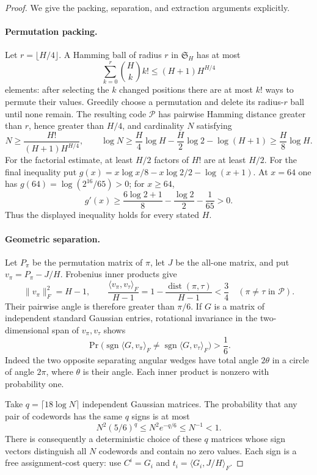 \documentclass[11pt]{article}
\begin{document}
\begin{proof}
We give the packing, separation, and extraction arguments explicitly.

\paragraph{Permutation packing.}
Let $r=\lfloor H/4\rfloor$. A Hamming ball of radius $r$ in
$\mathfrak S_H$ has at most
\[
\sum_{k=0}^{r}\binom Hk k!
\leq(H+1)H^{H/4}
\]
elements: after selecting the $k$ changed positions there are at most
$k!$ ways to permute their values. Greedily choose a permutation and
delete its radius-$r$ ball until none remain. The resulting code
$\mathcal P$ has pairwise Hamming distance greater than $r$, hence
greater than $H/4$, and cardinality $N$ satisfying
\[
N\geq\frac{H!}{(H+1)H^{H/4}},\qquad
\log N\geq\frac H4\log H-\frac H2\log2-\log(H+1)
\geq\frac H8\log H.
\]
For the factorial estimate, at least $H/2$ factors of $H!$ are at least
$H/2$. For the final inequality put
$g(x)=x\log x/8-x\log2/2-\log(x+1)$.
At $x=64$ one has $g(64)=\log(2^{16}/65)>0$; for $x\geq64$,
\[
g'(x)\geq\frac{6\log2+1}{8}-\frac{\log2}{2}-\frac1{65}>0.
\]
Thus the displayed inequality holds for every stated $H$.

\paragraph{Geometric separation.}
Let $P_\pi$ be the permutation matrix of $\pi$, let $J$ be the all-one
matrix, and put $v_\pi=P_\pi-J/H$. Frobenius inner products give
\[
\|v_\pi\|_F^2=H-1,\qquad
\frac{\langle v_\pi,v_\tau\rangle_F}{H-1}
=1-\frac{\operatorname{dist}(\pi,\tau)}{H-1}<\frac34
\quad(\pi\ne\tau\text{ in }\mathcal P).
\]
Their pairwise angle is therefore greater than $\pi/6$.
If $G$ is a matrix of independent standard Gaussian entries, rotational
invariance in the two-dimensional span of $v_\pi,v_\tau$ shows
\[
\Pr\bigl(\operatorname{sgn}\langle G,v_\pi\rangle_F
\ne\operatorname{sgn}\langle G,v_\tau\rangle_F\bigr)>\frac16.
\]
Indeed the two opposite separating angular wedges have total angle
$2\theta$ in a circle of angle $2\pi$, where $\theta$ is their angle.
Each inner product is nonzero with probability one.

Take $q=\lceil18\log N\rceil$ independent Gaussian matrices.
The probability that any pair of codewords has the same $q$ signs is
at most
\[
N^2(5/6)^q\leq N^2e^{-q/6}\leq N^{-1}<1.
\]
There is consequently a deterministic choice of these $q$ matrices
whose sign vectors distinguish all $N$ codewords and contain no zero
values. Each sign is a free assignment-cost query: use $C^i=G_i$ and
$t_i=\langle G_i,J/H\rangle_F$.


\end{proof}
\end{document}

